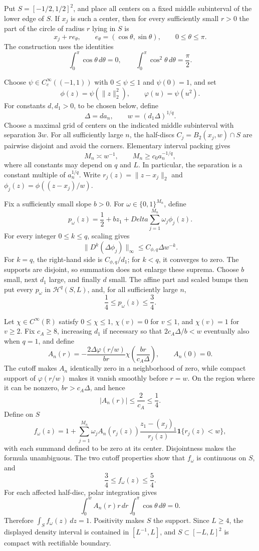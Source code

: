 Put \(S=[-1/2,1/2]^2\), and place all centers on a fixed middle subinterval of the lower edge of \(S\).  If \(x_j\) is such a center, then for every sufficiently small \(r>0\) the part of the circle of radius \(r\) lying in \(S\) is
\[
 x_j+r e_\theta,
 \qquad e_\theta=(\cos\theta,\sin\theta),
 \qquad 0\leq\theta\leq\pi.
\]
The construction uses the identities
\[
 \int_0^\pi\cos\theta\,d\theta=0,
 \qquad
 \int_0^\pi\cos^2\theta\,d\theta=\frac\pi2.
\]

Choose \(\psi\in C_c^\infty((-1,1))\) with \(0\leq\psi\leq1\) and \(\psi(0)=1\), and set
\[
 \phi(z)=\psi(\lVert z\rVert_2^2),
 \qquad
 \varphi(u)=\psi(u^2).
\]
For constants \(d,d_1>0\), to be chosen below, define
\[
 \Delta=d a_n,
 \qquad
 w=(d_1\Delta)^{1/q}.
\]
Choose a maximal grid of centers on the indicated middle subinterval with separation \(3w\).  For all sufficiently large \(n\), the half-discs \(C_j=B_2(x_j,w)\cap S\) are pairwise disjoint and avoid the corners.  Elementary interval packing gives
\[
 M_n\asymp w^{-1},
 \qquad
 M_n\geq c_0a_n^{-1/q},
\]
where all constants may depend on \(q\) and \(L\).  In particular, the separation is a constant multiple of \(a_n^{1/q}\).  Write \(r_j(z)=\lVert z-x_j\rVert_2\) and \(\phi_j(z)=\phi((z-x_j)/w)\).

Fix a sufficiently small slope \(b>0\).  For \(\omega\in\{0,1\}^{M_n}\), define
\[
 p_\omega(z)=\frac12+bz_1+Delta\sum_{j=1}^{M_n}\omega_j\phi_j(z).
\]
For every integer \(0\leq k\leq q\), scaling gives
\[
 \lVert D^k(\Delta\phi_j)\rVert_\infty
 \leq C_{\phi,q}\Delta w^{-k}.
\]
For \(k=q\), the right-hand side is \(C_{\phi,q}/d_1\); for \(k<q\), it converges to zero.  The supports are disjoint, so summation does not enlarge these suprema.  Choose \(b\) small, next \(d_1\) large, and finally \(d\) small.  The affine part and scaled bumps then put every \(p_\omega\) in \(\mathcal H^q(S,L)\), and, for all sufficiently large \(n\),
\[
 \frac14\leq p_\omega(z)\leq\frac34.
\]

Let \(\chi\in C^\infty(\mathbb R)\) satisfy \(0\leq\chi\leq1\), \(\chi(v)=0\) for \(v\leq1\), and \(\chi(v)=1\) for \(v\geq2\).  Fix \(c_A\geq8\), increasing \(d_1\) if necessary so that \(2c_A\Delta/b<w\) eventually also when \(q=1\), and define
\[
 A_n(r)=-\frac{2\Delta\varphi(r/w)}{br}
 \chi\!\left(\frac{br}{c_A\Delta}\right),
 \qquad A_n(0)=0.
\]
The cutoff makes \(A_n\) identically zero in a neighborhood of zero, while compact support of \(\varphi(r/w)\) makes it vanish smoothly before \(r=w\).  On the region where it can be nonzero, \(br>c_A\Delta\), and hence
\[
 |A_n(r)|\leq\frac{2}{c_A}\leq\frac14.
\]
Define on \(S\)
\[
 f_\omega(z)=1+
 \sum_{j=1}^{M_n}\omega_j A_n(r_j(z))
 \frac{z_1-(x_j)_1}{r_j(z)}\mathbf1\{r_j(z)<w\},
\]
with each summand defined to be zero at its center.  Disjointness makes the formula unambiguous.  The two cutoff properties show that \(f_\omega\) is continuous on \(S\), and
\[
 \frac34\leq f_\omega(z)\leq\frac54.
\]
For each affected half-disc, polar integration gives
\[
 \int_0^w A_n(r)r\,dr\int_0^\pi\cos\theta\,d\theta=0.
\]
Therefore \(\int_S f_\omega(z)\,dz=1\).  Positivity makes \(S\) the support.  Since \(L\geq4\), the displayed density interval is contained in \([L^{-1},L]\), and \(S\subset[-L,L]^2\) is compact with rectifiable boundary.

